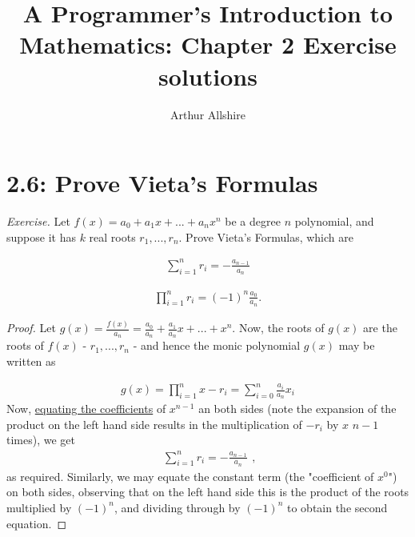 \documentclass{article}
\author{Arthur Allshire}
\title{A Programmer's Introduction to Mathematics: Chapter 2 Exercise solutions}
\begin{document}
\maketitle

\section*{2.6: Prove Vieta's Formulas}
{\it Exercise.} Let $f(x) = a_0 + a_1x + ... + a_nx^n$ be a degree $n$ polynomial, and suppose
it has $k$ real roots $r_1, ..., r_n$. Prove Vieta's Formulas, which are

\[
\begin{aligned}
\displaystyle\sum_{i=1}^{n} r_i = -\frac{a_{n-1}}{a_n}
\end{aligned}
\]

\[
\begin{aligned}
\displaystyle\prod_{i=1}^{n} r_i = (-1)^n \frac{a_0}{a_n}.
\end{aligned}
\]

\begin{proof}

Let $g(x) = \frac{f(x)}{a_n} = \frac{a_0}{a_n} + \frac{a_1}{a_n}x + ... + x^n$.
Now, the roots of $g(x)$ are the roots of $f(x)$ - $r_1,...,r_n$ - and hence the
monic polynomial $g(x)$ may be written as

\[
\begin{aligned}
g(x) = \displaystyle\prod_{i=1}^{n} x - r_i = \displaystyle\sum_{i=0}^{n} \frac{a_i}{a_n} x_i
\end{aligned}
\]
Now, \href{https://en.wikipedia.org/wiki/Equating_coefficients}{equating the coefficients}
of $x^{n-1}$ an both sides (note the expansion of the product on the left hand
side results in the multiplication of $-r_i$ by $x$ $n-1$ times), we get
\[
\begin{aligned}
\displaystyle\sum_{i=1}^{n} r_i = -\frac{a_{n-1}}{a_n}
\end{aligned},
\]as required.
Similarly, we may equate the constant term (the "coefficient of $x^0$") on both sides,
observing that on the left hand side this is the product of the roots multiplied by $(-1)^n$, and
dividing through by $(-1)^n$ to obtain the second equation.

\end{proof}
\end{document}
